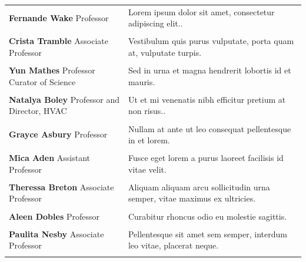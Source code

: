 \documentclass{book} %
\begin{document}
\begin{table}[ht!]
\begin{tabular}{p{2.5in} p{4.5in}}
\textbf{Fernande Wake} \newline Professor & Lorem ipsum dolor sit amet, consectetur adipiscing elit..\\ \\
\textbf{Crista Tramble} \newline Associate Professor & Vestibulum quis purus vulputate, porta quam at, vulputate turpis.\\ \\
\textbf{Yun Mathes} \newline Professor \newline Curator of Science & Sed in urna et magna hendrerit lobortis id et mauris.\\ \\
\textbf{Natalya Boley} \newline Professor and Director, HVAC & Ut et mi venenatis nibh efficitur pretium at non risus..\\ \\
\textbf{Grayce Asbury} \newline Professor & Nullam at ante ut leo consequat pellentesque in et lorem. \\ \\
\textbf{Mica Aden} \newline Assistant Professor & Fusce eget lorem a purus laoreet facilisis id vitae velit. \\ \\
\textbf{Theressa Breton} \newline Associate Professor & Aliquam aliquam arcu sollicitudin urna semper, vitae maximus ex ultricies.\\ \\
\textbf{Aleen Dobles } \newline Professor & Curabitur rhoncus odio eu molestie sagittis.\\ \\
\textbf{Paulita Nesby} \newline Associate Professor & Pellentesque sit amet sem semper, interdum leo vitae, placerat neque.\\ \\

\end{tabular}
\end{table}
\end{document}
